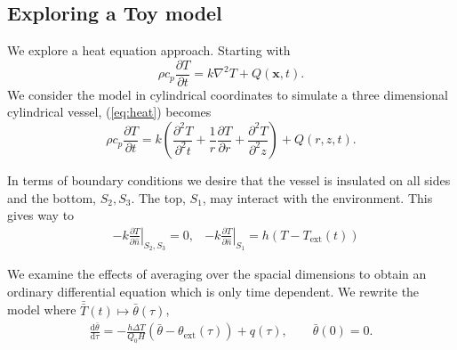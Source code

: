 \documentclass{beamer}
\newcommand{\pd}[2]{\frac{\partial #1}{\partial #2}}
\newcommand{\deriv}[2]{\frac{\mathrm{d} #1}{\mathrm{d} #2}}
\begin{document}
\subsection{Exploring a Toy model}
\begin{frame}
  We explore a heat equation approach. Starting with
  \begin{equation}\label{eq:heat}
\rho c_p \pd{T}{t} = k \nabla^2T + Q(\mathbf{x},t).
\end{equation}
We consider the model in cylindrical coordinates to
simulate a three dimensional cylindrical vessel, (\ref{eq:heat}) becomes
\begin{equation}
 \rho c_p \pd{T}{t} = k \left( \frac{\partial^2 T}{\partial^2 t} + 
    \frac{1}{r} \pd{T}{r} + \frac{\partial^2 T}{\partial^2 z}\right) + Q(r,z,t).
\end{equation}
\end{frame}

\begin{frame}
In terms of boundary conditions we desire that the vessel is insulated
on all sides and the bottom, $S_2, S_3$. The top, $S_1$, may interact
with the environment. This gives way to
\begin{align}
&-k \left.\pd{T}{\hat{n}}\right|_{S_2, S_3} = 0,  &-k \left.\pd{T}{\hat{n}}\right|_{S_1} = h(T - T_{\text{ext}}(t))
\end{align}
\end{frame}

\begin{frame}
  We examine the effects of averaging over the spacial dimensions to
  obtain an ordinary differential equation which is only time
  dependent. We rewrite the model where $\bar{\bar{T}}(t) \mapsto
  \bar{\theta}(\tau)$, 
  \begin{align}\label{eq:mod}
    \deriv{\bar{\theta}}{\tau} =-\frac{h\Delta T}{Q_0H}
    \left(\bar{\theta}-\theta_\text{ext}(\tau)\right)
    + q(\tau), 
    \quad\quad \bar{\theta}(0)=0.
  \end{align}
\end{frame}
\end{document}
